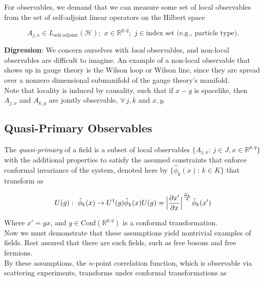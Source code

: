 \noindent For observables, we demand that we can measure some set of local observables from the set of self-adjoint linear operators on the Hilbert space

\begin{equation}
A_{j,x} \in L_{\text{self-adjoint}} (\mathcal{H}); \,\, x \in \mathbb{R}^{p,q}; \,\, j \in \text{index set (e.g., particle type)}.
\end{equation}

\noindent \textbf{Digression}: We concern ourselves with \textit{local} observables, and non-local observables are difficult to imagine. An example of a non-local observable that shows up in gauge theory is the Wilson loop or Wilson line, since they are spread over a nonzero dimensional submanifold of the gauge theory's manifold. \\

\noindent Note that locality is induced by causality, such that if $x-y$ is spacelike, then $A_{j,x}$ and $A_{k,y}$ are jointly observable, $\forall \, j,k \text{ and } x,y$. \\

\subsection*{Quasi-Primary Observables}

\noindent The \textit{quasi-primary} of a field is a subset of local observables $\{ A_{j,x}: \, j \in J, x \in \mathbb{R}^{p,q} \}$ with the additional properties to satisfy the assumed constraints that enforce conformal invariance of the system, denoted here by $\{ \hat{\phi}_k (x): \, k \in K \}$ that transform as

\begin{equation}
U(g): \,\, \hat{\phi}_k (x) \rightarrow U^\dagger (g) \hat{\phi}_k (x) U(g) = \Big{|} \frac{\partial x'}{\partial x} \Big{|}^{\frac{\Delta_k}{d}} \hat{\phi}_k (x')
\end{equation}

\noindent Where $x' = gx$, and $g \in \text{Conf}(\mathbb{R}^{p,q})$ is a conformal transformation. \\

\noindent Now we must demonstrate that these assumptions yield nontrivial examples of fields. Rest assured that there are such fields, such as free bosons and free fermions. \\

\noindent By these assumptions, the $n$-point correlation function, which is observable via scattering experiments,  transforms under conformal transformations as


